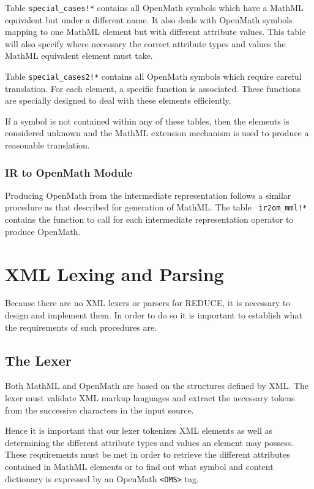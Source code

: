 Table {\tt special\_cases!*} contains all OpenMath symbols which have a MathML equivalent but under a different name. It also deals with OpenMath
symbols mapping to one MathML element but with different attribute values. This table will also specify where necessary the correct attribute types
and values the MathML equivalent element must take.

Table {\tt special\_cases2!*} contains all OpenMath symbols which require careful translation. For each element, a specific function is associated.
These functions are specially designed to deal with these elements efficiently.

If a symbol is not contained within any of these tables, then the elements is considered unknown and the MathML extension mechanism is used to
produce a reasonable translation.

\subsubsection{IR to OpenMath Module}

Producing OpenMath from the intermediate representation follows a similar procedure as that described for generation of MathML. The table {\tt
ir2om\_mml!*} contains the function to call for each intermediate representation operator to produce OpenMath.

\section{XML Lexing and Parsing}

Because there are no XML lexers or parsers for REDUCE, it is necessary to design and implement them. In order to do so it is important to establish
what the requirements of such procedures are.

\subsection{The Lexer}

Both MathML and OpenMath are based on the structures defined by XML. The lexer must validate XML markup languages and extract the necessary tokens
from the successive characters in the input source.

Hence it is important that our lexer tokenizes XML elements as well as determining the different attribute types and values an element may possess.
These requirements must be met in order to retrieve the different attributes contained in MathML elements or to find out what symbol and content
dictionary is expressed by an OpenMath \verb|<OMS>| tag.

